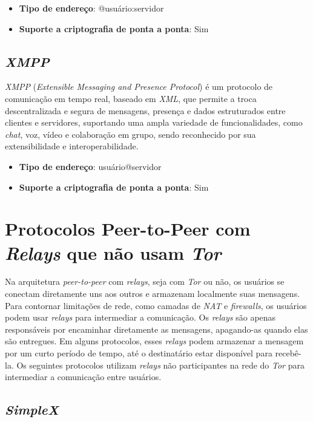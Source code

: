 \begin{itemize}
  \item \textbf{Tipo de endereço}: @usuário:servidor
  \item \textbf{Suporte a criptografia de ponta a ponta}: Sim
\end{itemize}

\subsection{\textit{XMPP}}

\textit{XMPP} (\textit{Extensible Messaging and Presence Protocol}) é um protocolo de comunicação em tempo real, baseado em \textit{XML}, que permite a troca descentralizada e segura de mensagens, presença e dados estruturados entre clientes e servidores, suportando uma ampla variedade de funcionalidades, como \textit{chat}, voz, vídeo e colaboração em grupo, sendo reconhecido por sua extensibilidade e interoperabilidade. \cite{xmppspec}

\begin{itemize}
  \item \textbf{Tipo de endereço}: usuário@servidor
  \item \textbf{Suporte a criptografia de ponta a ponta}: Sim
\end{itemize}
\section{Protocolos Peer-to-Peer com \textit{Relays} que não usam \textit{Tor}}

Na arquitetura \textit{peer-to-peer} com \textit{relays}, seja com \textit{Tor} ou não, os usuários se conectam diretamente uns aos outros e armazenam localmente suas mensagens. Para contornar limitações de rede, como camadas de \textit{NAT} e \textit{firewalls}, os usuários podem usar \textit{relays} para intermediar a comunicação. Os \textit{relays} são apenas responsáveis por encaminhar diretamente as mensagens, apagando-as quando elas são entregues. Em alguns protocolos, esses \textit{relays} podem armazenar a mensagem por um curto período de tempo, até o destinatário estar disponível para recebê-la. Os seguintes protocolos utilizam \textit{relays} não participantes na rede do \textit{Tor} para intermediar a comunicação entre usuários.

\subsection{\textit{SimpleX}}

